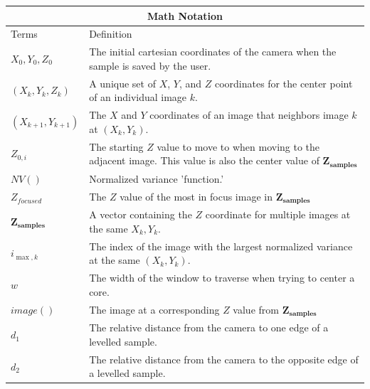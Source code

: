 \documentclass[a4paper,12pt]{article}
\begin{document}
\begin{tabular}{ |p{3cm}||p{12cm}|  }
  \hline
  \multicolumn{2}{|c|}{Math Notation} \\
  \hline
  Terms & Definition\\
  \hline
  $X_0, Y_0, Z_0$   &The initial cartesian coordinates of the camera when the sample is saved by the user. \\
  $(X_k, Y_k, Z_k)$ & A unique set of $X$, $Y$, and $Z$ coordinates for the center point of an individual image $k$. \\
  $(X_{k+1}, Y_{k+1})$ & The $X$ and $Y$ coordinates of an image that neighbors image $k$ at $(X_k, Y_k)$. \\
  $Z_{0,i}$ & The starting $Z$ value to move to when moving to the adjacent image. This value is also the center value of $\boldsymbol{Z_{\text{samples}}}$ \\
  $NV()$ & Normalized variance 'function.' \\
  $Z_{focused}$ & The $Z$ value of the most in focus image in $\boldsymbol{Z_{\text{samples}}}$\\
  $\boldsymbol{Z_{\text{samples}}}$ & A vector containing the $Z$ coordinate for multiple images at the same $X_k, Y_k$. \\
  $i_{\max,k}$ & The index of the image with the largest normalized variance at the same $(X_k, Y_k)$. \\
  $w$ & The width of the window to traverse when trying to center a core. \\
  $image()$ & The image at a corresponding $Z$ value from $\boldsymbol{Z_{\text{samples}}}$ \\
  $d_1$ & The relative distance from the camera to one edge of a levelled sample. \\
  $d_2$ & The relative distance from the camera to the opposite edge of a levelled sample. \\

  \hline
 \end{tabular}



\end{document}
